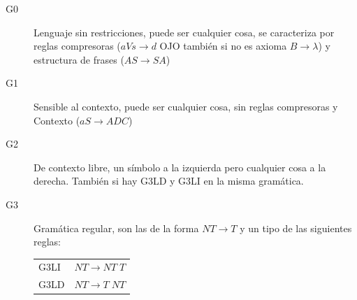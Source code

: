 \documentclass[12pt, twoside, openright]{report} %
\begin{document}
\begin{description}
	\item[G0] Lenguaje sin restricciones, puede ser cualquier cosa, se caracteriza por reglas compresoras ($aVs \rightarrow d$ OJO también si no es axioma $B \rightarrow \lambda$) y estructura de frases ($AS \rightarrow SA$)
	\item[G1] Sensible al contexto, puede ser cualquier cosa, sin reglas compresoras y Contexto ($aS \rightarrow ADC$)
	\item[G2] De contexto libre, un símbolo a la izquierda pero cualquier cosa a la derecha. También si hay G3LD y G3LI en la misma gramática.
	\item[G3] Gramática regular, son las de la forma $NT \rightarrow T$ y un tipo de las siguientes reglas:
	\begin{table}[H]
		\centering\begin{tabular}{ll}
		G3LI	& $NT \rightarrow NT \; T$\\
		G3LD	& $NT \rightarrow T \; NT$
		\end{tabular}
	\end{table}
\end{description}
\end{document}
